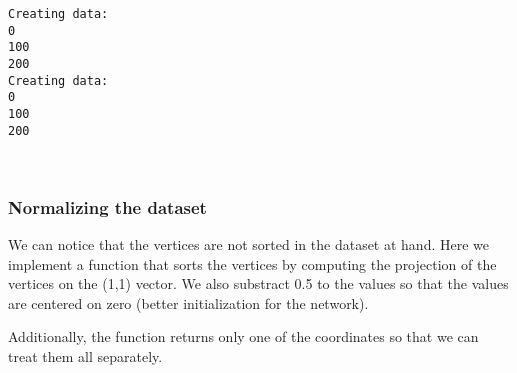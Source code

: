 \documentclass[11pt]{article}
\begin{document}
    \begin{Verbatim}[commandchars=\\\{\}]
Creating data:
0
100
200
Creating data:
0
100
200

    \end{Verbatim}

    \begin{center}
    \end{center}
    { \hspace*{\fill} \\}
    
    \hypertarget{normalizing-the-dataset}{%
\subsubsection{Normalizing the dataset}\label{normalizing-the-dataset}}

We can notice that the vertices are not sorted in the dataset at hand.
Here we implement a function that sorts the vertices by computing the
projection of the vertices on the (1,1) vector. We also substract 0.5 to
the values so that the values are centered on zero (better
initialization for the network).

Additionally, the function returns only one of the coordinates so that
we can treat them all separately.
\end{document}
